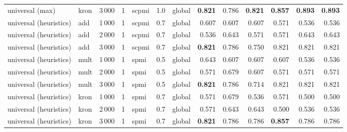 \begin{tabular}{lllllllrrrrrr}
universal (max)        & kron & 3\,000 & 1    & scpmi & 1.0 & global &        \textbf{0.821} &         0.786 &           \textbf{0.821} &            \textbf{0.857} &             \textbf{0.893} &       \textbf{0.893} \\
\addlinespace
universal (heuristics) & add  & 1\,000 & 1    & scpmi & 0.7 & global &        0.607 &         0.607 &           0.607 &            0.571 &             0.536 &       0.536 \\
universal (heuristics) & add  & 2\,000 & 1    & scpmi & 0.7 & global &        0.536 &         0.643 &           0.571 &            0.571 &             0.643 &       0.643 \\
universal (heuristics) & add  & 3\,000 & 1    & scpmi & 0.7 & global &        \textbf{0.821} &         0.786 &           0.750 &            0.821 &             0.821 &       0.821 \\
\addlinespace
universal (heuristics) & mult & 1\,000 & 1    & spmi  & 0.5 & global &        0.643 &         0.607 &           0.607 &            0.607 &             0.536 &       0.536 \\
universal (heuristics) & mult & 2\,000 & 1    & spmi  & 0.5 & global &        0.571 &         0.679 &           0.607 &            0.571 &             0.571 &       0.571 \\
universal (heuristics) & mult & 3\,000 & 1    & spmi  & 0.5 & global &        \textbf{0.821} &         0.786 &           0.714 &            0.821 &             0.821 &       0.821 \\
\addlinespace
universal (heuristics) & kron & 1\,000 & 1    & spmi  & 0.7 & global &        0.571 &         0.679 &           0.536 &            0.571 &             0.500 &       0.500 \\
universal (heuristics) & kron & 2\,000 & 1    & spmi  & 0.7 & global &        0.571 &         0.643 &           0.643 &            0.500 &             0.536 &       0.536 \\
universal (heuristics) & kron & 3\,000 & 1    & spmi  & 0.7 & global &        \textbf{0.821} &         0.786 &           0.786 &            \textbf{0.857} &             0.786 &       0.786 \\
\bottomrule
\end{tabular}
